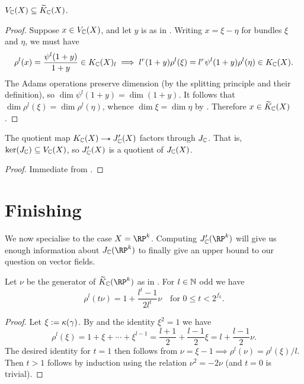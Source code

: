 \begin{lemma}
  \label{jprime-dim}
  $V_{\mathbb{C}}(X) \subseteq \widetilde K_{\mathbb{C}}(X)$.
\end{lemma}

\begin{proof}
  Suppose $x \in V_{\mathbb{C}}(X)$, and let $y$ is as in . Writing
  $x = \xi - \eta$ for bundles $\xi$ and $\eta$, we must have
  \[
  \rho^l(x) = \frac{\psi^l(1+y)}{1+y} \in K_{\mathbb{C}}(X)_l \implies
  l^r(1+y)\rho^l(\xi) = l^r\psi^l(1+y)\rho^l(\eta) \in K_{\mathbb{C}}(X).
  \]
  The Adams operations preserve dimension (by the splitting principle
  and their definition), so $\dim \psi^l(1+y) = \dim {(1+y)}$. It
  follows that $\dim \rho^l(\xi) = \dim \rho^l(\eta)$, whence $\dim
  \xi = \dim \eta$ by . Therefore $x \in
  \widetilde K_{\mathbb{C}}(X)$.
\end{proof}

\begin{proposition}
  \label{jprime-bound}
  The quotient map $K_\C(X) \to J_\C'(X)$ factors through
  $J_{\mathbb{C}}$. That is, $\ker(J_{\mathbb{C}}) \subseteq V_{\mathbb{C}}(X)$, so $J_{\mathbb{C}}'(X)$
  is a quotient of $J_{\mathbb{C}}(X)$.
\end{proposition}

\begin{proof}
  Immediate from .
\end{proof}


\section{Finishing}

We now specialise to the case $X = \RP^k$. Computing $J_\C'(\RP^k)$
will give us enough information about $J_\C(\RP^k)$ to finally give
an upper bound to our question  on vector fields.

\begin{lemma}
  \label{RP-cannibal}
  Let $\nu$ be the generator of $\til K_\C(\RP^k)$ as in
  . For $l \in \mathbb{N}$ odd we have
  \[
  \rho^l(t\nu) = 1 + \frac{l^t-1}{2l^t}\nu \quad\text{for }0 \le t <
  2^{f_k}.
  \]
\end{lemma}

\begin{proof}
  Let $\xi \mathrel{:=} \kappa(\gamma)$. By  and the
  identity $\xi^2 = 1$ we have
  \[
  \rho^l(\xi) = 1 + \xi + \cdots + \xi^{l-1} = \frac{l+1}2 +
  \frac{l-1}2\xi = l + \frac{l-1}{2}\nu.
  \]
  The desired identity for $t=1$ then follows from $\nu = \xi - 1
  \implies \rho^l(\nu) = \rho^l(\xi)/l$. Then $t > 1$ follows by
  induction using the relation $\nu^2 = -2\nu$ (and $t=0$ is trivial).
\end{proof}

